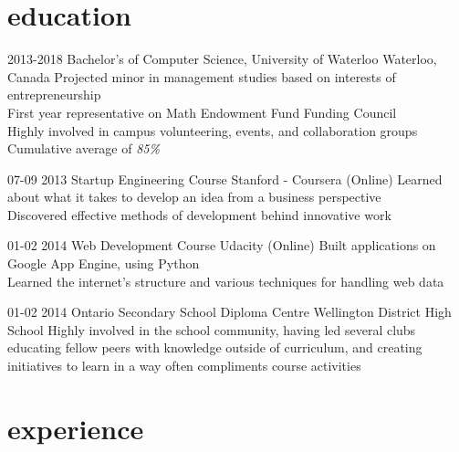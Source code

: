 \documentclass[]{friggeri-cv}
\newcommand{\imp}[1] {{\em #1}}
\begin{document}
\section{education}

\begin{entrylist}
  \entry
    {2013-2018}
    {Bachelor's of Computer Science, University of Waterloo}
    {Waterloo, Canada}
	{Projected minor in management studies based on interests of entrepreneurship \\
	First year representative on Math Endowment Fund Funding Council \\
	Highly involved in campus volunteering, events, and collaboration groups \\ Cumulative average of \imp{85\%}}
	
  \entry
  	{07-09 2013}
  	{Startup Engineering Course}
  	{Stanford - Coursera (Online)}
  	{Learned about what it takes to develop an idea from a business perspective \\
  	Discovered effective methods of development behind innovative work}
  	
  \entry
  	{01-02 2014}
  	{Web Development Course}
  	{Udacity (Online)}
  	{Built applications on Google App Engine, using Python \\
  	Learned the internet's structure and various techniques for handling web data}
  	
  \entry
  	{01-02 2014}
  	{Ontario Secondary School Diploma}
  	{Centre Wellington District High School}
    {Highly involved in the school community, having led several clubs educating fellow peers with knowledge outside of curriculum, and creating initiatives to learn in a way often compliments course activities}
\end{entrylist}

\section{experience}
\end{document}
